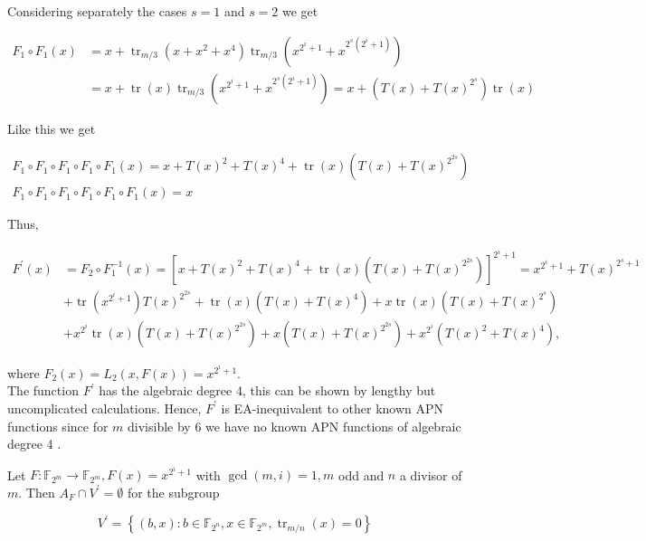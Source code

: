 \documentclass[10pt]{article}
\begin{document}
Considering separately the cases $s=1$ and $s=2$ we get

$$
\begin{aligned}
F_{1} \circ F_{1}(x) & =x+\operatorname{tr}_{m / 3}\left(x+x^{2}+x^{4}\right) \operatorname{tr}_{m / 3}\left(x^{2^{i}+1}+x^{2^{s}\left(2^{i}+1\right)}\right) \\
& =x+\operatorname{tr}(x) \operatorname{tr}_{m / 3}\left(x^{2^{i}+1}+x^{2^{s}\left(2^{i}+1\right)}\right)=x+\left(T(x)+T(x)^{2^{s}}\right) \operatorname{tr}(x)
\end{aligned}
$$

Like this we get

$$
\begin{gathered}
F_{1} \circ F_{1} \circ F_{1} \circ F_{1} \circ F_{1}(x)=x+T(x)^{2}+T(x)^{4}+\operatorname{tr}(x)\left(T(x)+T(x)^{2^{2 s}}\right) \\
F_{1} \circ F_{1} \circ F_{1} \circ F_{1} \circ F_{1} \circ F_{1}(x)=x
\end{gathered}
$$

Thus,

$$
\begin{aligned}
F^{\prime}(x) & =F_{2} \circ F_{1}^{-1}(x)=\left[x+T(x)^{2}+T(x)^{4}+\operatorname{tr}(x)\left(T(x)+T(x)^{2^{2 s}}\right)\right]^{2^{i}+1}=x^{2^{i}+1}+T(x)^{2^{s}+1} \\
& +\operatorname{tr}\left(x^{2^{i}+1}\right) T(x)^{2^{2 s}}+\operatorname{tr}(x)\left(T(x)+T(x)^{4}\right)+x \operatorname{tr}(x)\left(T(x)+T(x)^{2^{s}}\right) \\
& +x^{2^{i}} \operatorname{tr}(x)\left(T(x)+T(x)^{2^{2 s}}\right)+x\left(T(x)+T(x)^{2^{2 s}}\right)+x^{2^{i}}\left(T(x)^{2}+T(x)^{4}\right),
\end{aligned}
$$

where $F_{2}(x)=L_{2}(x, F(x))=x^{2^{i}+1}$.\\
The function $F^{\prime}$ has the algebraic degree 4, this can be shown by lengthy but uncomplicated calculations. Hence, $F^{\prime}$ is EA-inequivalent to other known APN functions since for $m$ divisible by 6 we have no known APN functions of algebraic degree 4 .

Let $F: \mathbb{F}_{2^{m}} \rightarrow \mathbb{F}_{2^{m}}, F(x)=x^{2^{i}+1}$ with $\operatorname{gcd}(m, i)=1, m$ odd and $n$ a divisor of $m$. Then $A_{F} \cap V^{\prime}=\emptyset$ for the subgroup

$$
V^{\prime}=\left\{(b, x): b \in \mathbb{F}_{2^{n}}, x \in \mathbb{F}_{2^{m}}, \operatorname{tr}_{m / n}(x)=0\right\}
$$
\end{document}
